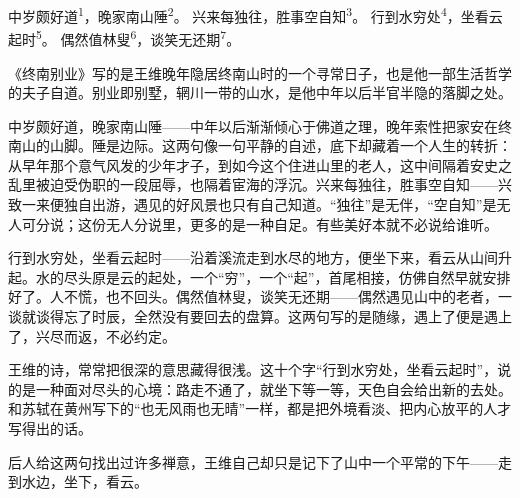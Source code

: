 
\begin{poem}
中岁颇好道\textsuperscript{1}，晚家南山陲\textsuperscript{2}。
兴来每独往，胜事空自知\textsuperscript{3}。
行到水穷处\textsuperscript{4}，坐看云起时\textsuperscript{5}。
偶然值林叟\textsuperscript{6}，谈笑无还期\textsuperscript{7}。
\end{poem}

\begin{annotations}
\end{annotations}

\begin{appreciation}
《终南别业》写的是王维晚年隐居终南山时的一个寻常日子，也是他一部生活哲学的夫子自道。别业即别墅，辋川一带的山水，是他中年以后半官半隐的落脚之处。

中岁颇好道，晚家南山陲——中年以后渐渐倾心于佛道之理，晚年索性把家安在终南山的山脚。陲是边际。这两句像一句平静的自述，底下却藏着一个人生的转折：从早年那个意气风发的少年才子，到如今这个住进山里的老人，这中间隔着安史之乱里被迫受伪职的一段屈辱，也隔着宦海的浮沉。兴来每独往，胜事空自知——兴致一来便独自出游，遇见的好风景也只有自己知道。“独往”是无伴，“空自知”是无人可分说；这份无人分说里，更多的是一种自足。有些美好本就不必说给谁听。

行到水穷处，坐看云起时——沿着溪流走到水尽的地方，便坐下来，看云从山间升起。水的尽头原是云的起处，一个“穷”，一个“起”，首尾相接，仿佛自然早就安排好了。人不慌，也不回头。偶然值林叟，谈笑无还期——偶然遇见山中的老者，一谈就谈得忘了时辰，全然没有要回去的盘算。这两句写的是随缘，遇上了便是遇上了，兴尽而返，不必约定。

王维的诗，常常把很深的意思藏得很浅。这十个字“行到水穷处，坐看云起时”，说的是一种面对尽头的心境：路走不通了，就坐下等一等，天色自会给出新的去处。和苏轼在黄州写下的“也无风雨也无晴”一样，都是把外境看淡、把内心放平的人才写得出的话。

后人给这两句找出过许多禅意，王维自己却只是记下了山中一个平常的下午——走到水边，坐下，看云。
\end{appreciation}
